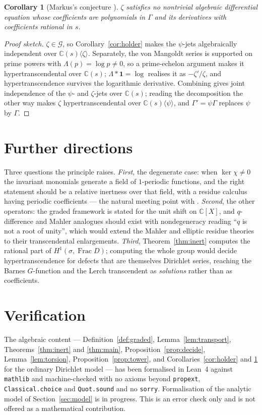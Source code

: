 \documentclass[11pt,a4paper]{amsart}
\theoremstyle{plain}
\newtheorem{corollary}[theorem]{Corollary}
\theoremstyle{definition}
\newcommand{\CC}{\mathbb{C}}
\newcommand{\sig}{\sigma}
\newcommand{\Frac}{\operatorname{Frac}}
\newcommand{\GG}{\mathcal{G}}
\begin{document}
\begin{corollary}[Markus's conjecture \cite{Markus2007,Lu2025}]\label{cor:markus}
$\zeta$ satisfies no nontrivial algebraic differential equation whose coefficients are polynomials in
$\Gamma$ and its derivatives with coefficients rational in $s$.
\end{corollary}
\begin{proof}[Proof sketch]
$\zeta\in\GG$, so Corollary~\ref{cor:holder} makes the $\psi$-jets algebraically independent over
$\CC(s)\langle\zeta\rangle$. Separately, the von Mangoldt series is supported on prime powers with
$\Lambda(p)=\log p\neq0$, so a prime-echelon argument makes it hypertranscendental over $\CC(s)$;
$\Lambda*\mathbf1=\log$ realises it as $-\zeta'/\zeta$, and hypertranscendence survives the
logarithmic derivative. Combining gives joint independence of the $\psi$- and $\zeta$-jets over
$\CC(s)$; reading the decomposition the other way makes $\zeta$ hypertranscendental over
$\CC(s)\langle\psi\rangle$, and $\Gamma'=\psi\Gamma$ replaces $\psi$ by $\Gamma$.
\end{proof}

\section{Further directions}

Three questions the principle raises. \emph{First}, the degenerate case: when $\ker\chi\neq0$ the
invariant monomials generate a field of $1$-periodic functions, and the right statement should be a
relative inertness over that field, with a residue calculus having periodic coefficients ---
the natural meeting point with \cite{ADHexp2026}. \emph{Second}, the other operators: the graded
framework is stated for the unit shift on $\CC[X]$, and $q$-difference and Mahler analogues should
exist with nondegeneracy reading ``$q$ is not a root of unity'', which would extend the Mahler and
elliptic residue theories \cite{Arreche2022Mahler,ArrecheBabbitt2025} to their transcendental
enlargements. \emph{Third}, Theorem~\ref{thm:inert} computes the rational part of
$H^1(\sig,\Frac D)$; computing the whole group would decide hypertranscendence for defects that are
themselves Dirichlet series, reaching the Barnes $G$-function and the Lerch transcendent as
\emph{solutions} rather than as coefficients.

\section*{Verification}
The algebraic content --- Definition~\ref{def:graded}, Lemma~\ref{lem:transport},
Theorems~\ref{thm:inert} and \ref{thm:main}, Proposition~\ref{prop:decide}, Lemma~\ref{lem:torsion},
Proposition~\ref{prop:tower}, and Corollaries~\ref{cor:holder} and \ref{cor:markus} for the ordinary
Dirichlet model --- has been formalised in Lean~4 against \texttt{mathlib} and machine-checked with
no axioms beyond \texttt{propext}, \texttt{Classical.choice} and \texttt{Quot.sound} and no
\texttt{sorry}. Formalisation of the analytic model of Section~\ref{sec:model} is in progress. This
is an error check only and is not offered as a mathematical contribution.
\end{document}

